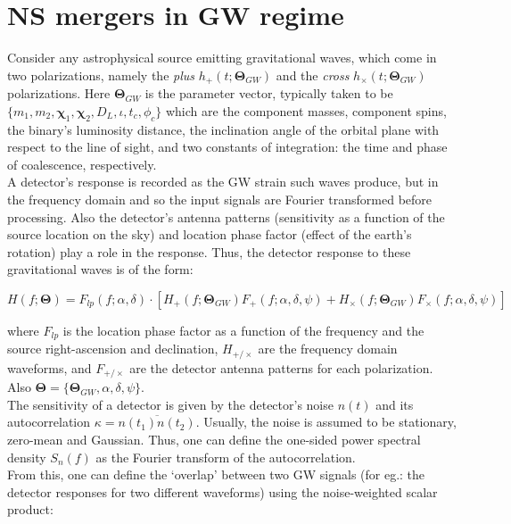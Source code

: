 \section{NS mergers in GW regime}

    Consider any astrophysical source emitting gravitational waves, which come in two
    polarizations, namely the \emph{plus} $h_{+}(t; \mathbf{\Theta}_{GW})$ and the
    \emph{cross} $h_{\times}(t; \mathbf{\Theta}_{GW})$ polarizations. Here
    $\mathbf{\Theta}_{GW}$ is the parameter vector, typically taken to be $\{m_1, m_2,
    \mathbf{\chi}_1, \mathbf{\chi}_2, D_L, \iota, t_c, \phi_c\}$ which are the component
    masses, component spins, the binary's luminosity distance, the inclination angle
    of the orbital plane with respect to the line of sight, and two constants of
    integration: the time and phase of coalescence, respectively.\\
    A detector's response is recorded as the GW strain such waves produce, but in the
    frequency domain and so the input signals are Fourier transformed before processing.
    Also the detector's antenna patterns (sensitivity as a function of the source
    location on the sky) and location phase factor (effect of the earth's rotation) play
    a role in the response. Thus, the detector response to these gravitational waves is
    of the form:

    \begin{equation}
        H(f; \mathbf{\Theta}) =
            F_{lp}(f; \alpha, \delta) \cdot
            [
                H_{+}(f; \mathbf{\Theta}_{GW}) F_{+}(f; \alpha, \delta, \psi) +
                H_{\times}(f; \mathbf{\Theta}_{GW}) F_{\times}(f; \alpha, \delta, \psi)
            ]
    \end{equation}

    where $F_{lp}$ is the location phase factor as a function of the frequency and the
    source right-ascension and declination, $H_{+/\times}$ are the frequency domain
    waveforms, and $F_{+/\times}$ are the detector antenna patterns for each
    polarization. Also $\mathbf{\Theta} = \{\mathbf{\Theta}_{GW}, \alpha, \delta,
    \psi\}$.\\ The sensitivity of a detector is given by the detector's noise $n(t)$ and
    its autocorrelation $\kappa = \overline{n(t_1)n(t_2)}$. Usually, the noise is
    assumed to be stationary, zero-mean and Gaussian. Thus, one can define the one-sided
    power spectral density $S_n(f)$ as the Fourier transform of the autocorrelation.\\
    From this, one can define the `overlap' between two GW signals (for eg.: the
    detector responses for two different waveforms) using the noise-weighted scalar
    product:

